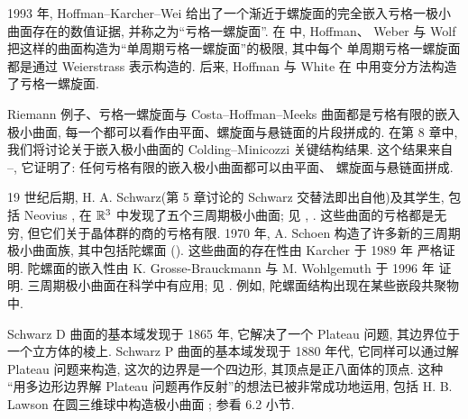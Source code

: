 
1993 年, Hoffman--Karcher--Wei 给出了一个渐近于螺旋面的完全嵌入亏格一极小
曲面存在的数值证据, 并称之为``亏格一螺旋面''. 在 \cite{HoWW} 中, Hoffman、
Weber 与 Wolf 把这样的曲面构造为``单周期亏格一螺旋面''的极限, 其中每个
单周期亏格一螺旋面都是通过 Weierstrass 表示构造的. 后来, Hoffman 与 White
在 \cite{HoWh1} 中用变分方法构造了亏格一螺旋面.



Riemann 例子、亏格一螺旋面与 Costa--Hoffman--Meeks 曲面都是亏格有限的嵌入
极小曲面, 每一个都可以看作由平面、螺旋面与悬链面的片段拼成的. 在第 8 章中,
我们将讨论关于嵌入极小曲面的 Colding--Minicozzi 关键结构结果. 这个结果来自
\cite{CM3}--\cite{CM7}, 它证明了: 任何亏格有限的嵌入极小曲面都可以由平面、
螺旋面与悬链面拼成.

19 世纪后期, H. A. Schwarz(第 5 章讨论的 Schwarz 交替法即出自他)及其学生,
包括 Neovius \cite{Ne}, 在 $\mathbb{R}^3$ 中发现了五个三周期极小曲面; 见 \cite{Sz2},
\cite{Sz3}. 这些曲面的亏格都是无穷, 但它们关于晶体群的商的亏格有限. 1970 年,
A. Schoen \cite{Sca} 构造了许多新的三周期极小曲面族, 其中包括陀螺面
(). 这些曲面的存在性由 Karcher 于 1989 年
\cite{Kr} 严格证明. 陀螺面的嵌入性由 K. Grosse-Brauckmann 与 M. Wohlgemuth
于 1996 年 \cite{GrW} 证明. 三周期极小曲面在科学中有应用; 见 \cite{AHHT}.
例如, 陀螺面结构出现在某些嵌段共聚物中.



Schwarz D 曲面的基本域发现于 1865 年, 它解决了一个 Plateau 问题, 其边界位于
一个立方体的棱上. Schwarz P 曲面的基本域发现于 1880 年代, 它同样可以通过解
Plateau 问题来构造, 这次的边界是一个四边形, 其顶点是正八面体的顶点. 这种
``用多边形边界解 Plateau 问题再作反射''的想法已被非常成功地运用, 包括
H. B. Lawson 在圆三维球中构造极小曲面 \cite{La1}; 参看 6.2 小节.

